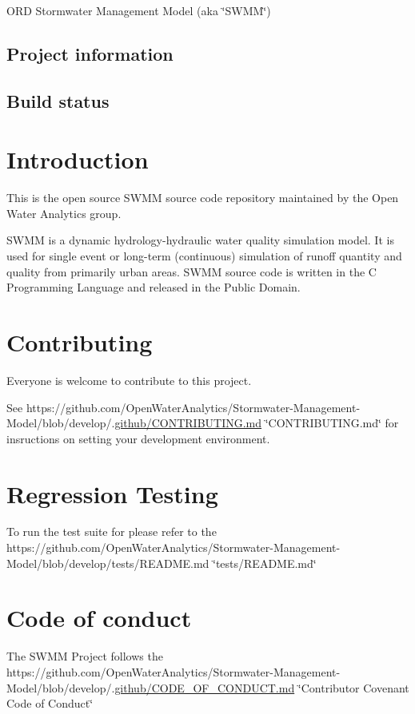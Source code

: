 O\+RD Stormwater Management Model (aka \char`\"{}\+S\+W\+M\+M\char`\"{})

\subsection*{Project information}

\href{https://github.com/OpenWaterAnalytics/Stormwater-Management-Model}{\tt } \href{https://gitter.im/OpenWaterAnalytics/lobby}{\tt }

\subsection*{Build status}

\href{https://ci.appveyor.com/project/OpenWaterAnalytics/stormwater-management-model/branch/develop}{\tt } \href{https://travis-ci.org/OpenWaterAnalytics/Stormwater-Management-Model}{\tt }

\section*{Introduction}

This is the open source S\+W\+MM source code repository maintained by the Open Water Analytics group.

S\+W\+MM is a dynamic hydrology-\/hydraulic water quality simulation model. It is used for single event or long-\/term (continuous) simulation of runoff quantity and quality from primarily urban areas. S\+W\+MM source code is written in the C Programming Language and released in the Public Domain.

\section*{Contributing}

Everyone is welcome to contribute to this project.

See https\+://github.com/\+Open\+Water\+Analytics/\+Stormwater-\/\+Management-\/\+Model/blob/develop/.\hyperlink{_c_o_n_t_r_i_b_u_t_i_n_g_8md_source}{github/\+C\+O\+N\+T\+R\+I\+B\+U\+T\+I\+N\+G.\+md} \char`\"{}\+C\+O\+N\+T\+R\+I\+B\+U\+T\+I\+N\+G.\+md\char`\"{} for insructions on setting your development environment.

\section*{Regression Testing}

To run the test suite for please refer to the https\+://github.com/\+Open\+Water\+Analytics/\+Stormwater-\/\+Management-\/\+Model/blob/develop/tests/\+R\+E\+A\+D\+M\+E.\+md \char`\"{}tests/\+R\+E\+A\+D\+M\+E.\+md\char`\"{}

\section*{Code of conduct}

The S\+W\+MM Project follows the https\+://github.com/\+Open\+Water\+Analytics/\+Stormwater-\/\+Management-\/\+Model/blob/develop/.\hyperlink{_c_o_d_e___o_f___c_o_n_d_u_c_t_8md_source}{github/\+C\+O\+D\+E\+\_\+\+O\+F\+\_\+\+C\+O\+N\+D\+U\+C\+T.\+md} \char`\"{}\+Contributor Covenant Code of Conduct\char`\"{} 